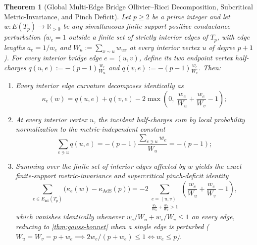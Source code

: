 \documentclass[11pt,a4paper]{article}
\numberwithin{equation}{section}
\theoremstyle{plain}
\newtheorem{theorem}{Theorem}[section]
\theoremstyle{definition}
\theoremstyle{remark}
\newcommand{\R}{\mathbb{R}}
\newcommand{\Tp}{T_p}
\begin{document}
\begin{theorem}[Global Multi-Edge Bridge Ollivier--Ricci Decomposition, Subcritical Metric-Invariance, and Pinch Deficit]
\label{thm:gauss-bonnet-global}
Let $p \ge 2$ be a prime integer and let $w : E(\Tp) \to \R_{>0}$ be \emph{any} simultaneous finite-support positive conductance perturbation ($w_e = 1$ outside a finite set of strictly interior edges of $\Tp$, with edge lengths $a_e = 1/w_e$ and $W_u := \sum_{x \sim u} w_{ux}$ at every interior vertex $u$ of degree $p+1$). For every interior bridge edge $e = (u, v)$, define its two endpoint vertex half-charges $q(u, e) := -(p-1)\frac{w_e}{W_u}$ and $q(v, e) := -(p-1)\frac{w_e}{W_v}$. Then:
\begin{enumerate}[leftmargin=1.8em,itemsep=2pt]
  \item Every interior edge curvature decomposes identically as
  \begin{equation}
    \kappa_e(w) = q(u, e) + q(v, e) - 2\max\!\left(0,\; \frac{w_e}{W_u} + \frac{w_e}{W_v} - 1\right);
    \label{eq:global-charge-decomp}
  \end{equation}
  \item At every interior vertex $u$, the incident half-charges sum by local probability normalization to the metric-independent constant
  \begin{equation}
    \sum_{e \ni u} q(u, e) = -(p - 1)\frac{\sum_{e \ni u} w_e}{W_u} = -(p - 1);
    \label{eq:vertex-charge-conservation}
  \end{equation}
  \item Summing over the finite set of interior edges affected by $w$ yields the exact finite-support metric-invariance and supercritical pinch-deficit identity
  \begin{equation}
    \sum_{e \in E_{\mathrm{int}}(\Tp)} \bigl(\kappa_e(w) - \kappa_{\mathrm{AdS}}(p)\bigr)
    = -2 \sum_{\substack{e=(u,v) \\ \frac{w_e}{W_u} + \frac{w_e}{W_v} > 1}} \left(\frac{w_e}{W_u} + \frac{w_e}{W_v} - 1\right),
    \label{eq:global-gauss-bonnet}
  \end{equation}
  which vanishes identically whenever $w_e/W_u + w_e/W_v \le 1$ on every edge, reducing to \cref{thm:gauss-bonnet} when a single edge is perturbed ($W_u = W_v = p + w_e \implies 2 w_e/(p + w_e) \le 1 \iff w_e \le p$).
\end{enumerate}
\end{theorem}
\end{document}
